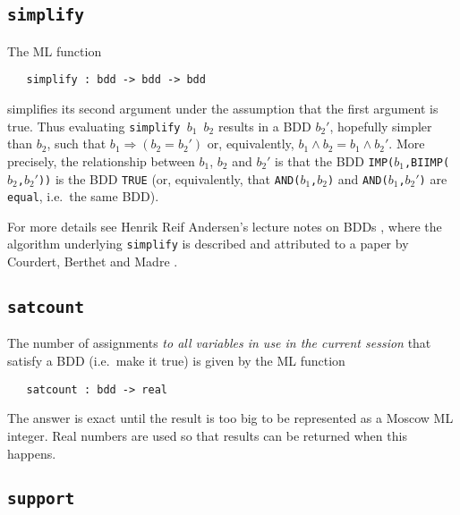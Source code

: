 \documentclass[12pt]{article}
\newcommand{\bnind}[1]{\index[MLbn]{#1}}
\renewcommand{\t}[1]{\mbox{\tt #1}}
\newcommand{\ty}[1]{\mbox{\tt #1}}
\newcommand{\ml}[1]{{\tt #1}}
\newcommand\fun{\mbox{\tt{->}}}
\newcommand{\Imp}{\Rightarrow}
\begin{document}
\subsection{\t{simplify}}

The ML function

%
%

\begin{verbatim}
   simplify : bdd -> bdd -> bdd
\end{verbatim}\bnind{\ml{simplify}}

simplifies its second argument under the assumption that the first
argument is true. Thus evaluating
\t{simplify~$b_1$~$b_2$} results in a BDD $b_2'$, hopefully simpler than $b_2$, such that
$b_1 \Imp (b_2 = b_2')$ or, equivalently, \mbox{$b_1 \wedge b_2 = b_1 \wedge b_2'$}.
More precisely,
the relationship between $b_1$, $b_2$ and $b_2'$ is that
the BDD \t{IMP($b_1$,BIIMP($b_2$,$b_2'$))} is the BDD \t{TRUE}
(or, equivalently, that \t{AND($b_1$,$b_2$)} and \t{AND($b_1$,$b_2'$)}
are \t{equal}, i.e.~the same BDD).

For more details see Henrik Reif Andersen's lecture
notes on BDDs \cite{HenrikNotes}, where
the algorithm underlying \t{simplify} is described and attributed to a paper by
Courdert, Berthet and Madre \cite{CoudertBerthetMadre}.

\subsection{\t{satcount}}


The number of assignments {\it to all variables in use in the current
session\/} that satisfy a BDD (i.e.~make it true) is given by the ML
function

%
%

\begin{verbatim}
   satcount : bdd -> real
\end{verbatim}\bnind{\ml{satcount}}



The answer is exact until the result is too big to be represented as a
Moscow ML integer. Real numbers are used so that results can be
returned when this happens.

\subsection{\t{support}}
\end{document}
